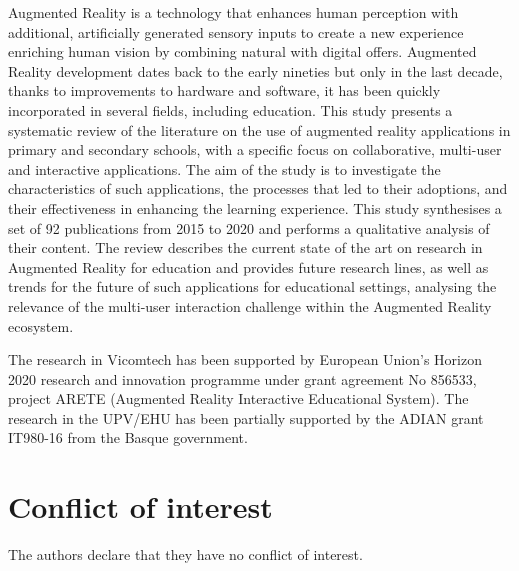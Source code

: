 \documentclass[twocolumn]{svjour3}          %
\newcommand{\papersSelected}[0]{92 }
\newenvironment{abstract2}
 {\small
  \begin{center}
  \bfseries \abstractname\vspace{-.5em}\vspace{0pt}
  \end{center}
  \list{}{%
    \setlength{\leftmargin}{0mm}%
    \setlength{\rightmargin}{\leftmargin}%
  }%
  \item\relax}
 {\endlist}
\begin{document}
\maketitle
\begin{abstract2}
Augmented Reality is a technology that enhances human perception with additional, artificially generated sensory inputs to create a new experience enriching human vision by combining natural with digital offers. Augmented Reality development dates back to the early nineties but only in the last decade, thanks to improvements to hardware and software, it has been quickly incorporated in several fields, including education. This study presents a systematic review of the literature on the use of augmented reality applications in primary and secondary schools, with a specific focus on collaborative, multi-user and interactive applications. The aim of the study is to investigate the characteristics of such applications, the processes that led to their adoptions, and their effectiveness in enhancing the learning experience. This study synthesises a set of \papersSelected publications from 2015 to 2020 and performs a qualitative analysis of their content. The review describes the current state of the art on research in Augmented Reality for education and provides future research lines, as well as trends for the future of such applications for educational settings, analysing the relevance of the multi-user interaction challenge within the Augmented Reality ecosystem.
\end{abstract2}











\begin{acknowledgements}
The research in Vicomtech has been supported by European Union’s Horizon 2020 research and innovation programme under grant agreement No 856533, project ARETE (Augmented Reality Interactive Educational System).
The research in the UPV/EHU has been partially supported by the ADIAN grant IT980-16 from the Basque government.
\end{acknowledgements}

\section*{Conflict of interest}
The authors declare that they have no conflict of interest.

\end{document}
